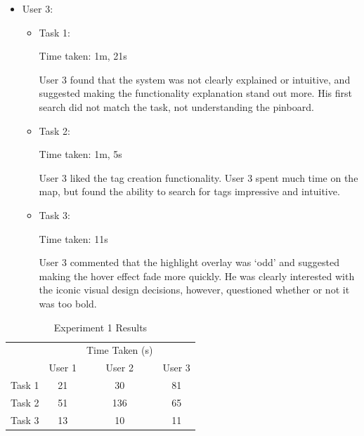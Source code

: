 \documentclass[10pt,a4paper]{article}
\begin{document}
\begin{itemize}
{\begin{itemize}
{Time taken: 10s

User 2 suggested changing some of the metrics offered and questioned how many users would find use in ranking ‘Service speed’ lowly.
The user was much quicker, understanding the system and using our functionality to generate the specific results.}

\end{itemize}}

\item{User 3:
\begin{itemize}

\item{Task 1:

Time taken: 1m, 21s

User 3 found that the system was not clearly explained or intuitive, and suggested making the functionality explanation stand out more.
His first search did not match the task, not understanding the pinboard.}
\item{Task 2:

Time taken: 1m, 5s

User 3 liked the tag creation functionality.
User 3 spent much time on the map, but found the ability to search for tags impressive and intuitive.}
\item{Task 3:

Time taken: 11s

User 3 commented that the highlight overlay was ‘odd’ and suggested making the hover effect fade more quickly.
He was clearly interested with the iconic visual design decisions, however, questioned whether or not it was too bold.}

\end{itemize}}
\end{itemize}


\begin{table}[H]
\centering
\begin{tabular}{c|ccc|}
\cline{2-4}
                             &                             & Time Taken (s)                &        \\ \cline{2-4} 
                             & \multicolumn{1}{c|}{User 1} & \multicolumn{1}{c|}{User 2} & User 3 \\ \hline
\multicolumn{1}{|c|}{Task 1} & \multicolumn{1}{c|}{21}       & \multicolumn{1}{c|}{30}       &     81  \\ \hline
\multicolumn{1}{|c|}{Task 2} & \multicolumn{1}{c|}{51}       & \multicolumn{1}{c|}{136}       &     65   \\ \hline
\multicolumn{1}{|c|}{Task 3} & \multicolumn{1}{c|}{13}       & \multicolumn{1}{c|}{10}       &    11   \\ \hline
\end{tabular}
\caption{Experiment 1 Results \label{table:experiment-1}}
\end{table}
\end{document}
